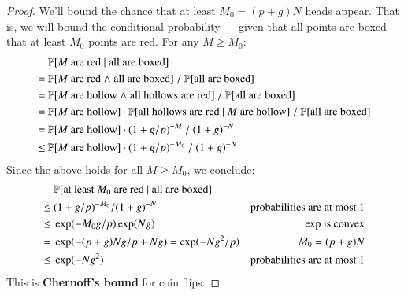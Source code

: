 \documentclass[openany, notitlepage, justified]{tufte-book}
\theoremstyle{plain}
\theoremstyle{definition}
\begin{document}
\begin{proof}
            We'll bound the chance that at least $M_0 = (p+g)N$ heads
            appear.  That is, we will bound the conditional probability ---
            given that all points are boxed --- that at least $M_0$
            points are red. 
            For any $M\geq M_0$:
            \begin{align*}
                    & ~ \mathbb{P}[\text{$M$ are red $\mid$ all are boxed}] \\
                  = & ~ \mathbb{P}[\text{$M$ are red $\wedge$ all are boxed}] ~/~ 
                        \mathbb{P}[\text{all are boxed}]  \\
                  = & ~ \mathbb{P}[\text{$M$ are hollow $\wedge$ all hollows are red}] ~/~ 
                        \mathbb{P}[\text{all are boxed}]  \\
                  = & ~ \mathbb{P}[\text{$M$ are hollow}] \cdot
                        \mathbb{P}[\text{all hollows are red $\mid$ $M$ are hollow}] ~/~
                        \mathbb{P}[\text{all are boxed}] \\
                  = & ~ \mathbb{P}[\text{$M$ are hollow}] \cdot (1+g/p)^{-M} ~/~ (1+g)^{-N}  \\
                \leq& ~ \mathbb{P}[\text{$M$ are hollow}] \cdot (1+g/p)^{-M_0} ~/~ (1+g)^{-N} 
            \end{align*}
            Since the above holds for all $M\geq M_0$, we conclude:
            \begin{align*}
                ~   & ~ \mathbb{P}[\text{at least $M_0$ are red $\mid$ all are boxed}] & \\
                \leq& ~ (1+g/p)^{-M_0} / (1+g)^{-N}             & \text{probabilities are at most $1$} \\
                \leq& ~ \exp(-M_0 g/p) \exp(Ng)                 & \text{$\exp$ is convex} \\ 
                =   & ~ \exp(-(p+g)N g/p + Ng) = \exp(-Ng^2/p)  & \text{$M_0=(p+g)N$} \\ 
                \leq& ~ \exp(-Ng^2)                             & \text{probabilities are at most $1$}
            \end{align*}
            This is \textbf{Chernoff's bound} for coin flips.
        \end{proof}
\end{document}
